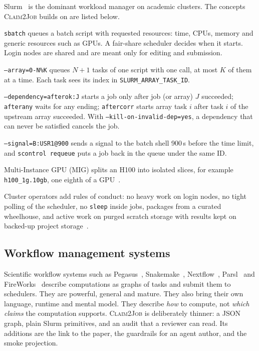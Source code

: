 \documentclass[pdflatex,sn-mathphys-num]{sn-jnl}
\theoremstyle{thmstyleone}%
\theoremstyle{thmstyletwo}%
\theoremstyle{thmstylethree}%
\newcommand{\cj}{\textsc{Claim2Job}}
\newcommand{\code}[1]{\texttt{#1}}
\begin{document}
Slurm~\cite{yoo2003slurm} is the dominant workload manager on academic
clusters. The concepts \cj{} builds on are listed below.
\begin{description}[leftmargin=1.1em, style=nextline, itemsep=1pt]
\item[Jobs and resources] \code{sbatch} queues a batch script with requested
resources: time, CPUs, memory and generic resources such as GPUs. A
fair-share scheduler decides when it starts. Login nodes are shared and are
meant only for editing and submission.
\item[Job arrays] \code{--array=0-N\%K} queues $N{+}1$ tasks of one script with
one call, at most $K$ of them at a time. Each task sees its index in
\code{SLURM\_ARRAY\_TASK\_ID}.
\item[Dependencies] \code{--dependency=afterok:J} starts a job only after job
(or array) $J$ succeeded; \code{afterany} waits for any ending; \code{aftercorr}
starts array task $i$ after task $i$ of the upstream array succeeded. With
\code{--kill-on-invalid-dep=yes}, a dependency that can never be satisfied
cancels the job.
\item[Signals and requeue] \code{--signal=B:USR1@900} sends a signal to the
batch shell 900\,s before the time limit, and \code{scontrol requeue} puts a
job back in the queue under the same ID.
\item[GPU partitioning] Multi-Instance GPU (MIG) splits an H100 into isolated
slices, for example \code{h100\_1g.10gb}, one eighth of a GPU~\cite{nvidia2023mig}.
\end{description}
Cluster operators add rules of conduct: no heavy work on login nodes, no tight
polling of the scheduler, no \code{sleep} inside jobs, packages from a curated
wheelhouse, and active work on purged scratch storage with results kept on
backed-up project storage~\cite{alliance2026docs}.

\subsection{Workflow management systems}\label{sec:bg-wms}

Scientific workflow systems such as Pegasus~\cite{deelman2015pegasus},
Snakemake~\cite{molder2021snakemake}, Nextflow~\cite{ditommaso2017nextflow},
Parsl~\cite{babuji2019parsl} and FireWorks~\cite{jain2015fireworks} describe
computations as graphs of tasks and submit them to schedulers. They are
powerful, general and mature. They also bring their own language, runtime and
mental model. They describe \emph{how} to compute, not \emph{which claims} the
computation supports. \cj{} is deliberately thinner: a JSON graph, plain Slurm
primitives, and an audit that a reviewer can read. Its additions are the link
to the paper, the guardrails for an agent author, and the smoke projection.
\end{document}
